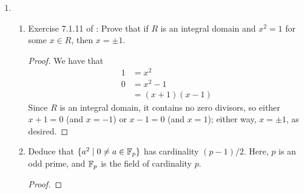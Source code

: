 \documentclass[../psets.tex]{subfiles}
\begin{document}
\begin{enumerate}
\begin{proof}
        See the answer to Q3.7. What I did there (and, I guess, what I would need to repeat here) is invoke the universal property of $R[X]$ under an appropriate auxiliary function ($\alpha=\id$). This would then guarantee me existence and uniqueness for a $\phi$ satisfying $\phi(c)=c$. Additionally, we must have a monomial argument because anything with degree other than 1 would alter the possible degrees we can access in the image, thereby making $\phi$ \emph{not} an isomorphism. By making the monomial as general as possible, i.e., with the two degrees of freedom $a,b$ in $ax+b$, we can be sure to capture \emph{all} relevant isomorphisms.
    \end{proof}
    \item 
    \begin{enumerate}[label={(\roman*)}]
        \item Exercise 7.1.11 of \textcite{bib:DummitFoote}: Prove that if $R$ is an integral domain and $x^2=1$ for some $x\in R$, then $x=\pm 1$.
        \begin{proof}
            We have that
            \begin{align*}
                1 &= x^2\\
                0 &= x^2-1\\
                &= (x+1)(x-1)
            \end{align*}
            Since $R$ is an integral domain, it contains no zero divisors, so either $x+1=0$ (and $x=-1$) or $x-1=0$ (and $x=1$); either way, $x=\pm 1$, as desired.
        \end{proof}
        \item Deduce that $\{a^2\mid 0\neq a\in\mathbb{F}_p\}$ has cardinality $(p-1)/2$. Here, $p$ is an odd prime, and $\mathbb{F}_p$ is the field of cardinality $p$.
        \begin{proof}






\end{proof}
\end{enumerate}
\end{enumerate}
\end{document}
